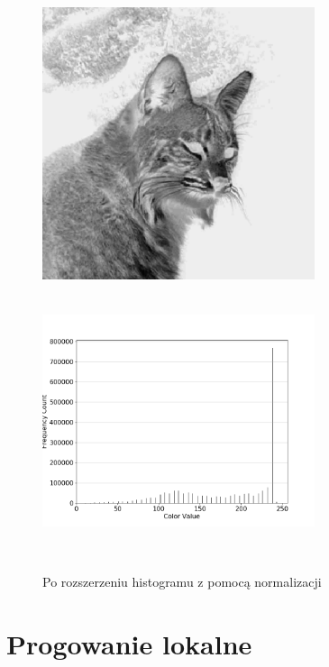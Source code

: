 \documentclass[a4paper,12pt]{book}
\begin{document}
\begin{figure}[H]
	\caption{Po rozszerzeniu histogramu z pomocą normalizacji}
	\includegraphics[width=8cm, height=8cm]{5-3/extend-histogram-image-cat-bright.png}
	\includegraphics[width=8cm, height=8cm]{5-3/extend-histogram-cat-bright.png}
\end{figure}

\section{Progowanie lokalne}
\end{document}
